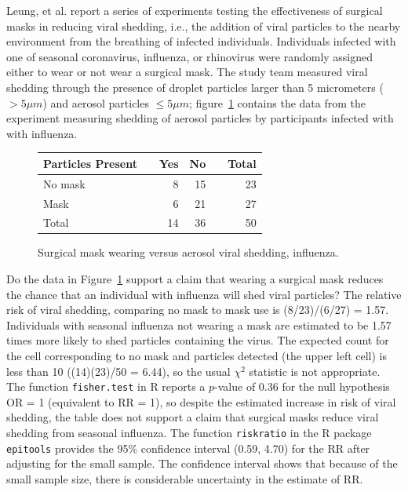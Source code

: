 Leung, et al. report a series of experiments testing the effectiveness of surgical masks in reducing viral shedding, i.e., the addition of viral particles to the nearby environment from the breathing of infected individuals.  Individuals infected with one of seasonal coronavirus, influenza, or rhinovirus were randomly assigned either to wear or not wear a surgical mask.  The study team measured viral shedding through the presence of droplet particles larger than 5 micrometers ($> 5\mu m$) and aerosol particles $\leq 5\mu m$; figure~\ref{figure:influenzaAerosolViralShedding} contains the data from the experiment measuring shedding of aerosol particles by participants infected with with influenza.
\begin{figure}[h]
	\centering
	\begin{tabular}{ll rrr |r}
		\hline
		Particles Present	& \hspace{2mm} & Yes & No & \hspace{2mm} & Total \\
		\hline
        No mask & & 8 & 15 & & 23    \\
        Mask &	& 6 & 21 & & 27    \\
        \hline
        Total & & 14 & 36 & & 50 \\
		\hline
	\end{tabular}
	\caption{Surgical mask wearing versus aerosol viral shedding, influenza.}
    \label{figure:influenzaAerosolViralShedding}
\end{figure}

\begin{examplewrap}
  \begin{nexample}{Do the data in Figure~\ref{figure:influenzaAerosolViralShedding} support a claim that wearing a surgical mask reduces the chance that an individual with influenza will shed viral particles?}
    The relative risk of viral shedding, comparing no mask to mask use is (8/23)/(6/27) = 1.57.  Individuals with seasonal influenza not wearing a mask are estimated to be 1.57 times more likely to shed particles containing the virus. The expected count for the cell corresponding to no mask and particles detected (the upper left cell) is less than 10 ((14)(23)/50 = 6.44), so the usual $\chi^2$ statistic is not appropriate.  The function \texttt{fisher.test} in \textsf{R} reports a $p$-value of 0.36 for the null hypothesis OR = 1 (equivalent to RR = 1), so despite the estimated increase in risk of viral shedding, the table does not support a claim that surgical masks reduce viral shedding from seasonal influenza.  The function \texttt{riskratio} in the \textsf{R} package \texttt{epitools} provides the 95\% confidence interval (0.59, 4.70) for the RR after adjusting for the small sample.  The confidence interval shows that because of the small sample size, there is considerable uncertainty in the estimate of RR.

  \end{nexample}
\end{examplewrap}

